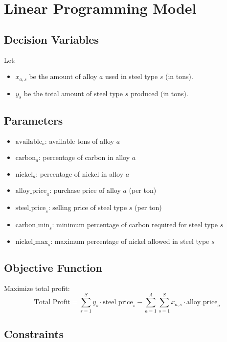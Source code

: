 \documentclass{article}
\begin{document}
\section*{Linear Programming Model}

\subsection*{Decision Variables}
Let:
\begin{itemize}
    \item \( x_{a,s} \) be the amount of alloy \( a \) used in steel type \( s \) (in tons).
    \item \( y_s \) be the total amount of steel type \( s \) produced (in tons).
\end{itemize}

\subsection*{Parameters}
\begin{itemize}
    \item \( \text{available}_{a} \): available tons of alloy \( a \)
    \item \( \text{carbon}_{a} \): percentage of carbon in alloy \( a \)
    \item \( \text{nickel}_{a} \): percentage of nickel in alloy \( a \)
    \item \( \text{alloy\_price}_{a} \): purchase price of alloy \( a \) (per ton)
    \item \( \text{steel\_price}_{s} \): selling price of steel type \( s \) (per ton)
    \item \( \text{carbon\_min}_{s} \): minimum percentage of carbon required for steel type \( s \)
    \item \( \text{nickel\_max}_{s} \): maximum percentage of nickel allowed in steel type \( s \)
\end{itemize}

\subsection*{Objective Function}
Maximize total profit:
\[
\text{Total Profit} = \sum_{s=1}^{S} y_s \cdot \text{steel\_price}_s - \sum_{a=1}^{A} \sum_{s=1}^{S} x_{a,s} \cdot \text{alloy\_price}_a
\]

\subsection*{Constraints}
\end{document}
